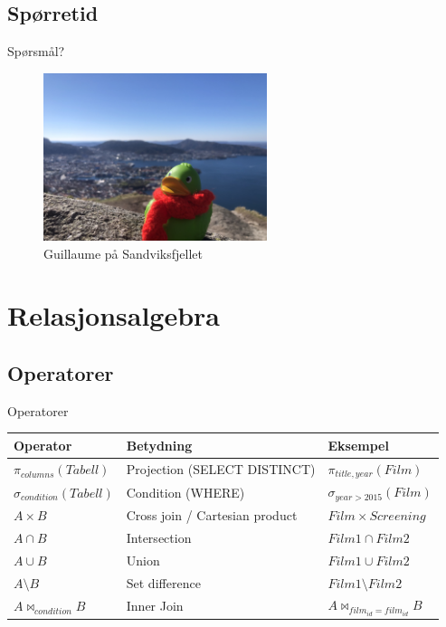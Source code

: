 \subsection*{Spørretid}
\begin{frame}{Spørsmål?}
    \begin{figure}
        \centering
        \includegraphics[height = 4.9cm]{images/guillaume1.jpg}
        \caption{Guillaume på Sandviksfjellet}
        \label{fig:guillaume1}
    \end{figure}
\end{frame}

\section{Relasjonsalgebra}
\subsection*{Operatorer}
\begin{frame}{Operatorer}
\begin{tabular}{l|l|l}
 Operator & Betydning & Eksempel\\\hline
 $\pi_{columns}(Tabell)$ & Projection (SELECT DISTINCT) & $\pi_{title, year}(Film)$\\
 $\sigma_{condition}(Tabell)$ & Condition (WHERE) & $\sigma_{year > 2015}(Film)$\\
 $A \times B$ & Cross join / Cartesian product & $Film \times Screening$\\
 $A \cap B$ & Intersection & $Film1 \cap Film2$ \\
 $A \cup B$ & Union & $Film1 \cup Film2$ \\
 $A \setminus B$ & Set difference &  $Film1 \setminus Film2$\\
 $A \bowtie_{condition} B$ & Inner Join & $A \bowtie_{film_{id}=film_{id}} B$\\
\end{tabular}
\end{frame}

